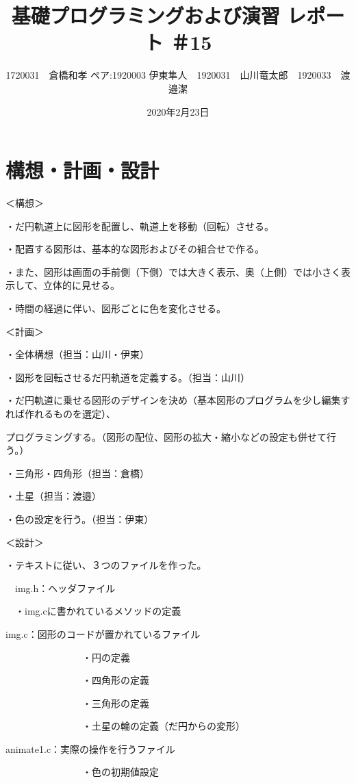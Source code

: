 \documentclass[12pt,a4j]{jarticle}
\begin{document}
\title{基礎プログラミングおよび演習 レポート ＃15}
\author{1720031　倉橋和孝 ペア:1920003 伊東隼人　1920031　山川竜太郎　1920033　渡邉潔}
\date{2020年2月23日}
\maketitle

\section{構想・計画・設計}

＜構想＞

・だ円軌道上に図形を配置し、軌道上を移動（回転）させる。

・配置する図形は、基本的な図形およびその組合せで作る。

・また、図形は画面の手前側（下側）では大きく表示、奥（上側）では小さく表示して、立体的に見せる。

・時間の経過に伴い、図形ごとに色を変化させる。

＜計画＞

・全体構想（担当：山川・伊東）

・図形を回転させるだ円軌道を定義する。（担当：山川）

・だ円軌道に乗せる図形のデザインを決め（基本図形のプログラムを少し編集すれば作れるものを選定）、

 プログラミングする。（図形の配位、図形の拡大・縮小などの設定も併せて行う。）
 
    ・三角形・四角形（担当：倉橋）
    
    ・土星（担当：渡邉）
    
・色の設定を行う。（担当：伊東）

＜設計＞

・テキストに従い、３つのファイルを作った。

　img.h：ヘッダファイル
 
　・img.cに書かれているメソッドの定義
        
  img.c：図形のコードが置かれているファイル
  
　　　　　　　　・円の定義
        
　　　　　　　　・四角形の定義
        
　　　　　　　　・三角形の定義
        
　　　　　　　　・土星の輪の定義（だ円からの変形）
        
  animate1.c：実際の操作を行うファイル
  
　　　　　　　　・色の初期値設定
        
\end{document}

